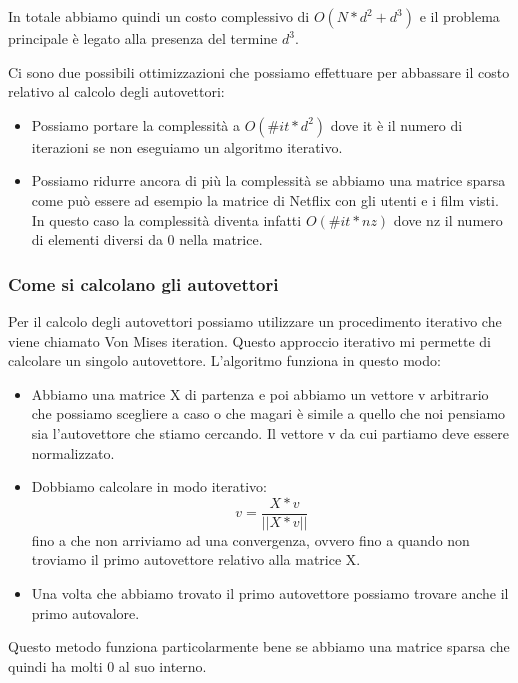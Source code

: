 \documentclass[14pt]{extreport}
\begin{document}
In totale abbiamo quindi un costo complessivo di $O(N*d^2+d^3)$ e il problema principale è legato alla presenza del termine $d^3$.

Ci sono due possibili ottimizzazioni che possiamo effettuare per abbassare il costo relativo al calcolo degli autovettori:
\begin{itemize}
\item Possiamo portare la complessità a $O(\#it * d^{2})$ dove it è il numero di iterazioni se non eseguiamo un algoritmo iterativo.
\item Possiamo ridurre ancora di più la complessità se abbiamo una matrice sparsa come può essere ad esempio la matrice di Netflix con gli utenti
e i film visti. In questo caso la complessità diventa infatti $O(\#it*nz)$ dove nz il numero di elementi diversi da 0 nella matrice.
\end{itemize}

\subsubsection{Come si calcolano gli autovettori}

Per il calcolo degli autovettori possiamo utilizzare un procedimento iterativo che viene chiamato Von Mises iteration. 
Questo approccio iterativo mi permette di calcolare un singolo autovettore.
L'algoritmo funziona in questo modo:

\begin{itemize}
	\item Abbiamo una matrice X di partenza e poi abbiamo un vettore v arbitrario che possiamo scegliere a caso o che magari 
	è simile a quello che noi pensiamo sia l'autovettore che stiamo cercando. Il vettore v da cui partiamo deve essere normalizzato.
	\item Dobbiamo calcolare in modo iterativo: $$v = \frac{X*v}{||X*v||}$$
	fino a che non arriviamo ad una convergenza, ovvero fino a quando non troviamo il primo autovettore relativo alla matrice X.
	\item Una volta che abbiamo trovato il primo autovettore possiamo trovare anche il primo autovalore.
\end{itemize}

Questo metodo funziona particolarmente bene se abbiamo una matrice sparsa che quindi ha molti 0 al suo interno.
\end{document}
